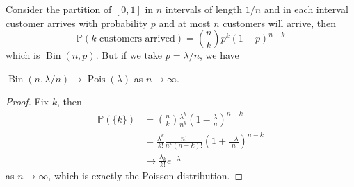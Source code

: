 Consider the partition of $[0,1]$ in $n$ intervals of length $1/n$ and in each interval customer arrives with probability $p$ and at most $n$ customers will arrive, then
$$\mathbb P(\text{$k$ customers arrived})=\binom{n}{k}p^k(1-p)^{n-k}$$
which is $\operatorname{Bin}(n,p)$.
But if we take $p=\lambda/n$, we have
\begin{proposition}
    $\operatorname{Bin}(n,\lambda/n)\to\operatorname{Pois}(\lambda)$ as $n\to\infty$.
\end{proposition}
\begin{proof}
    Fix $k$, then
    \begin{align*}
        \mathbb P(\{k\})&=\binom{n}{k}\frac{\lambda^k}{n^k}\left(1-\frac{\lambda}{n}\right)^{n-k}\\
        &=\frac{\lambda^k}{k!}\frac{n!}{n^k(n-k)!}(1+\frac{-\lambda}{n})^{n-k}\\
        &\to\frac{\lambda_k}{k!}e^{-\lambda}
    \end{align*}
    as $n\to\infty$, which is exactly the Poisson distribution.
\end{proof}
